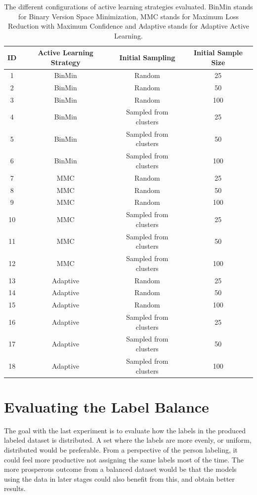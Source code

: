 \begin{table}
    \centering
    \begin{tabular}{|cccc|}
        \hline
        \textbf{ID} & \textbf{Active Learning Strategy} & \textbf{Initial Sampling} & \textbf{Initial Sample Size}\\
        \hline
        1 & BinMin & Random & 25\\
        2 & BinMin & Random & 50\\
        3 & BinMin & Random & 100\\
        4 & BinMin & Sampled from clusters & 25\\
        5 & BinMin & Sampled from clusters & 50\\
        6 & BinMin & Sampled from clusters & 100\\
        7 & MMC & Random & 25\\
        8 & MMC & Random & 50\\
        9 & MMC & Random & 100\\
        10 & MMC & Sampled from clusters & 25\\
        11 & MMC & Sampled from clusters & 50\\
        12 & MMC & Sampled from clusters & 100\\
        13 & Adaptive & Random & 25\\
        14 & Adaptive & Random & 50\\
        15 & Adaptive & Random & 100\\
        16 & Adaptive & Sampled from clusters & 25\\
        17 & Adaptive & Sampled from clusters & 50\\
        18 & Adaptive & Sampled from clusters & 100\\
        \hline
    \end{tabular}
    \caption{The different configurations of active learning strategies evaluated. BinMin stands for Binary Version Space Minimization, MMC stands for Maximum Loss Reduction with Maximum Confidence and Adaptive stands for Adaptive Active Learning.}
    \label{fig:active-learning-configurations}
\end{table}

\section{Evaluating the Label Balance}
The goal with the last experiment is to evaluate how the labels in the produced labeled dataset is distributed.
A set where the labels are more evenly, or uniform, distributed would be preferable.
From a perspective of the person labeling, it could feel more productive not assigning the same labels most of the time.
The more prosperous outcome from a balanced dataset would be that the models using the data in later stages could also benefit from this, and obtain better results.

